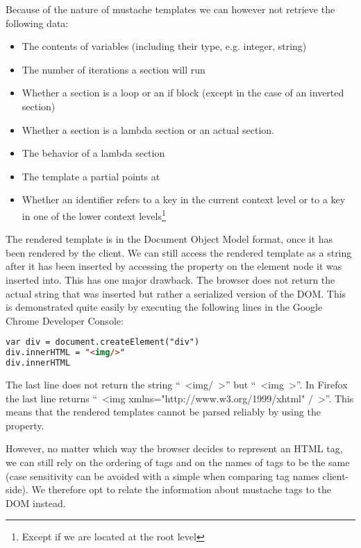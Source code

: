 \documentclass[thesis.tex]{subfiles}
\begin{document}
Because of the nature of mustache templates we can however not retrieve the
following data:

\begin{itemize}
\item The contents of variables (including their type, e.g. integer, string)
\item The number of iterations a section will run
\item Whether a section is a loop or an if block
      (except in the case of an inverted section)
\item Whether a section is a lambda section or an actual section.
\item The behavior of a lambda section
\item The template a partial points at
\item Whether an identifier refers to a key in the current context level or
      to a key in one of the lower context levels\footnote{
            Except if we are located at the root level}
\end{itemize}

The rendered template is in the Document Object Model format, once it has
been rendered by the client. We can still access the rendered template as a
string after it has been inserted by accessing the  property
on the element node it was inserted into. This has one major drawback.
The browser does not return the actual string that was inserted but rather a
serialized version of the DOM. This is demonstrated quite easily by executing
the following lines in the Google Chrome Developer Console:
\begin{lstlisting}[language=HTML]
var div = document.createElement("div")
div.innerHTML = "<img/>"
div.innerHTML
\end{lstlisting}

The last line does not return the string ``\ <img/\ >'' but ``\ <img\ >''.
In Firefox the last line returns ``\ <img xmlns="http://www.w3.org/1999/xhtml" /\ >''.
This means that the rendered templates cannot be parsed reliably by using the
 property.

However, no matter which way the browser decides to represent an HTML tag,
we can still rely on the ordering of tags and on the names of tags to be the same
(case sensitivity can be avoided with a simple
 when comparing tag names client-side).
We therefore opt to relate the information about mustache tags to the DOM instead.
\end{document}
